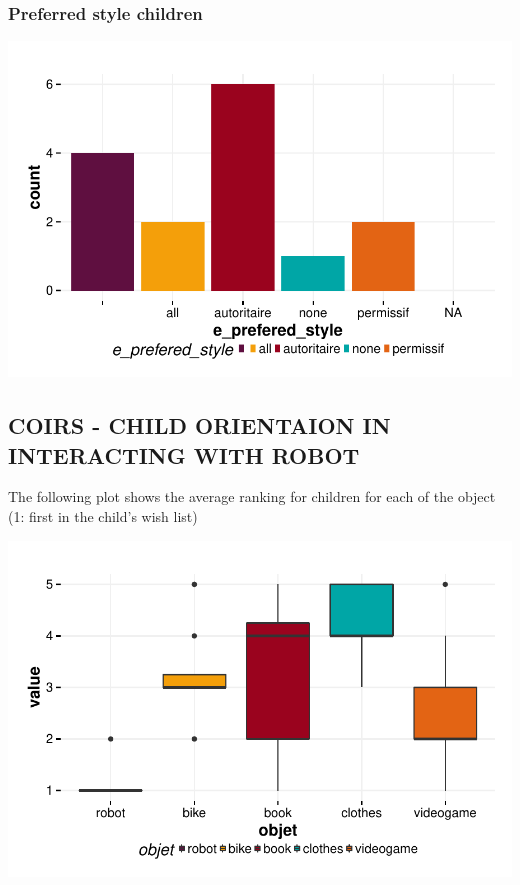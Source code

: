 \documentclass{article}
\begin{document}
\subsubsection{Preferred style children}
\includegraphics{interviews/interviews-plot_preferred_style_child}

\subsection{COIRS - CHILD ORIENTAION IN INTERACTING WITH ROBOT}

The following plot shows the average ranking for children for each of the object (1: first in the child's wish list)

\includegraphics{interviews/interviews-plot_coirs_child}
\end{document}
